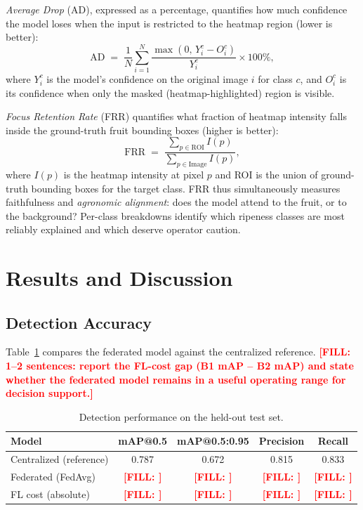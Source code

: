 \documentclass[a4paper,10pt]{article}
\newcommand{\tbd}[1]{\textcolor{red}{\textbf{[FILL: #1]}}}
\begin{document}
\textit{Average Drop} (AD), expressed as a percentage, quantifies how much
confidence the model loses when the input is restricted to the heatmap region
(lower is better):
\begin{equation}
\mathrm{AD} \;=\; \frac{1}{N} \sum_{i=1}^{N} \frac{\max(0,\, Y_i^c - O_i^c)}{Y_i^c} \times 100\%,
\label{eq:ad}
\end{equation}
where $Y_i^c$ is the model's confidence on the original image $i$ for class
$c$, and $O_i^c$ is its confidence when only the masked (heatmap-highlighted)
region is visible.

\textit{Focus Retention Rate} (FRR) quantifies what fraction of heatmap
intensity falls inside the ground-truth fruit bounding boxes (higher is
better):
\begin{equation}
\mathrm{FRR} \;=\; \frac{\sum_{p \in \mathrm{ROI}} I(p)}{\sum_{p \in \mathrm{Image}} I(p)},
\label{eq:frr}
\end{equation}
where $I(p)$ is the heatmap intensity at pixel $p$ and ROI is the union of
ground-truth bounding boxes for the target class. FRR thus simultaneously
measures faithfulness and \emph{agronomic alignment}: does the model attend
to the fruit, or to the background? Per-class breakdowns identify which
ripeness classes are most reliably explained and which deserve operator
caution.

\section{Results and Discussion}

\subsection{Detection Accuracy}
Table~\ref{tab:acc} compares the federated model against the centralized
reference. \tbd{1--2 sentences: report the FL-cost gap (B1 mAP -- B2 mAP) and
state whether the federated model remains in a useful operating range for
decision support.}

\begin{table}[ht]
\centering
\caption{Detection performance on the held-out test set.}
\label{tab:acc}
\begin{tabular}{lcccc}
\toprule
\textbf{Model} & \textbf{mAP@0.5} & \textbf{mAP@0.5:0.95} & \textbf{Precision} & \textbf{Recall} \\
\midrule
Centralized (reference) & 0.787 & 0.672 & 0.815 & 0.833 \\
Federated (FedAvg) & \tbd{} & \tbd{} & \tbd{} & \tbd{} \\
FL cost (absolute) & \tbd{} & \tbd{} & \tbd{} & \tbd{} \\
\bottomrule
\end{tabular}
\end{table}
\end{document}
